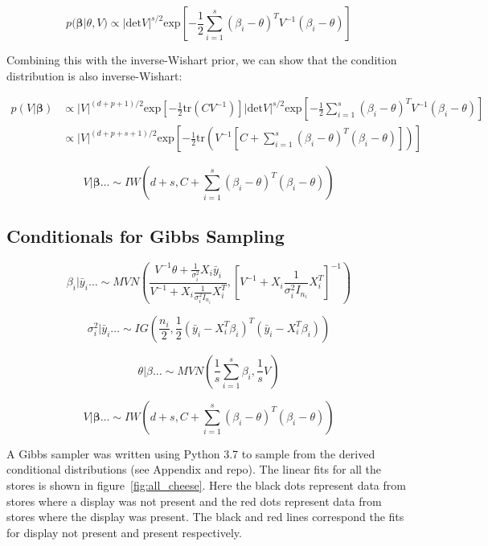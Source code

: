 \documentclass[11pt]{article}
\begin{document}
    $$p(\mathbf{\beta} | \theta, V) \propto | \text{det} V |^{s/2} \text{exp}\left[-\frac{1}{2} \sum_{i=1}^s (\beta_i - \theta)^T V^{-1} (\beta_i - \theta) \right] $$

    \noindent Combining this with the inverse-Wishart prior, we can show that the condition distribution is also inverse-Wishart:

    \begin{align*}
        p(V|\mathbf{\beta}) &\propto |V|^{(d+p+1)/2} \text{exp}\left[-\frac{1}{2} \text{tr}(C V^{-1}) \right] | \text{det} V |^{s/2} \text{exp}\left[-\frac{1}{2} \sum_{i=1}^s (\beta_i - \theta)^T V^{-1} (\beta_i - \theta) \right] \\
        &\propto |V|^{(d+p+s+1)/2} \text{exp}\left[-\frac{1}{2} \text{tr}\left(V^{-1}\left[C + \sum_{i=1}^s(\beta_i - \theta)^T (\beta_i - \theta) \right]\right) \right]
    \end{align*}

    $$V|\mathbf{\beta} \dots \sim IW\left( d+ s, C + \sum_{i=1}^s(\beta_i - \theta)^T (\beta_i - \theta) \right)$$

    \clearpage
    \subsection*{Conditionals for Gibbs Sampling}

    $$\beta_i | \bar{y}_i \dots \sim MVN\left(\frac{V^{-1} \theta + \frac{1}{\sigma_i^2 }X_i \bar{y}_i }{V^{-1} + X_i \frac{1}{\sigma_i^2 I_{n_i}} X_i^T}, \left[V^{-1} + X_i \frac{1}{\sigma_i^2 I_{n_i}} X_i^T \right]^{-1} \right)$$

    $$\sigma_i^2 | \bar{y}_i \dots \sim IG\left(\frac{n_i}{2},  \frac{1}{2} (\bar{y}_i - X_i^T \beta_i)^T (\bar{y}_i - X_i^T \beta_i)\right)$$

    $$\theta | \beta \dots \sim MVN \left(\frac{1}{s} \sum_{i=1}^s \beta_i, \frac{1}{s}V \right)$$

    $$V|\mathbf{\beta} \dots \sim IW\left( d+ s, C + \sum_{i=1}^s(\beta_i - \theta)^T (\beta_i - \theta) \right)$$

    A Gibbs sampler was written using Python 3.7 to sample from the derived conditional distributions (see Appendix and repo). The linear fits for all the stores is shown in figure~\ref{fig:all_cheese}. Here the black dots represent data from stores where a display was not present and the red dots represent data from stores where the display was present. The black and red lines correspond the fits for display not present and present respectively. 
\end{document}
